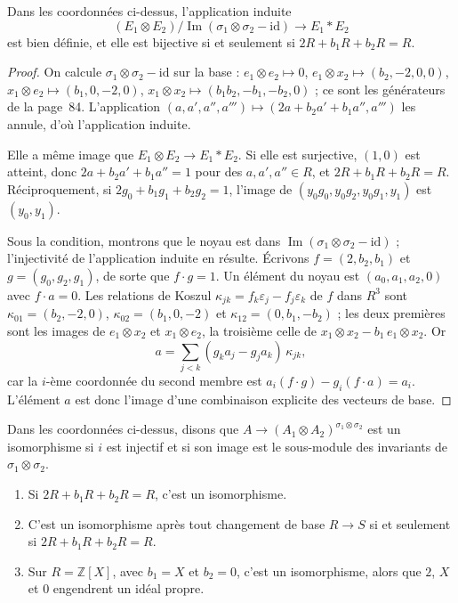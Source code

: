 \begin{encadre}
\begin{theoreme}
Dans les coordonnées ci-dessus, l'application induite
\[ (E_1 \otimes E_2)/\operatorname{Im}(\sigma_1 \otimes \sigma_2 - \mathrm{id}) \to E_1 * E_2 \]
est bien définie, et elle est bijective si et seulement si $2R + b_1R + b_2R = R$.
\end{theoreme}
\end{encadre}

\begin{proof}
On calcule $\sigma_1 \otimes \sigma_2 - \mathrm{id}$ sur la base : $e_1 \otimes e_2 \mapsto 0$, $e_1 \otimes x_2 \mapsto (b_2, -2, 0, 0)$, $x_1 \otimes e_2 \mapsto (b_1, 0, -2, 0)$, $x_1 \otimes x_2 \mapsto (b_1b_2, -b_1, -b_2, 0)$ ; ce sont les générateurs de la page~84. L'application $(a, a', a'', a''') \mapsto (2a + b_2a' + b_1a'', a''')$ les annule, d'où l'application induite.

Elle a même image que $E_1 \otimes E_2 \to E_1 * E_2$. Si elle est surjective, $(1, 0)$ est atteint, donc $2a + b_2a' + b_1a'' = 1$ pour des $a, a', a'' \in R$, et $2R + b_1R + b_2R = R$. Réciproquement, si $2g_0 + b_1g_1 + b_2g_2 = 1$, l'image de $(y_0g_0, y_0g_2, y_0g_1, y_1)$ est $(y_0, y_1)$.

Sous la condition, montrons que le noyau est dans $\operatorname{Im}(\sigma_1 \otimes \sigma_2 - \mathrm{id})$ ; l'injectivité de l'application induite en résulte. Écrivons $f = (2, b_2, b_1)$ et $g = (g_0, g_2, g_1)$, de sorte que $f \cdot g = 1$. Un élément du noyau est $(a_0, a_1, a_2, 0)$ avec $f \cdot a = 0$. Les relations de Koszul $\kappa_{jk} = f_k\varepsilon_j - f_j\varepsilon_k$ de $f$ dans $R^3$ sont $\kappa_{01} = (b_2, -2, 0)$, $\kappa_{02} = (b_1, 0, -2)$ et $\kappa_{12} = (0, b_1, -b_2)$ ; les deux premières sont les images de $e_1 \otimes x_2$ et $x_1 \otimes e_2$, la troisième celle de $x_1 \otimes x_2 - b_1\, e_1 \otimes x_2$. Or
\[ a = \sum_{j < k} (g_ka_j - g_ja_k)\,\kappa_{jk}, \]
car la $i$-ème coordonnée du second membre est $a_i (f \cdot g) - g_i (f \cdot a) = a_i$. L'élément $a$ est donc l'image d'une combinaison explicite des vecteurs de base.
\end{proof}

\begin{enonce}
Dans les coordonnées ci-dessus, disons que $A \to (A_1 \otimes A_2)^{\sigma_1 \otimes \sigma_2}$ est un isomorphisme si $i$ est injectif et si son image est le sous-module des invariants de $\sigma_1 \otimes \sigma_2$.
\begin{enumerate}
\item Si $2R + b_1R + b_2R = R$, c'est un isomorphisme.
\item C'est un isomorphisme après tout changement de base $R \to S$ si et seulement si $2R + b_1R + b_2R = R$.
\item Sur $R = \mathbb Z[X]$, avec $b_1 = X$ et $b_2 = 0$, c'est un isomorphisme, alors que $2$, $X$ et $0$ engendrent un idéal propre.
\end{enumerate}
\end{enonce}

